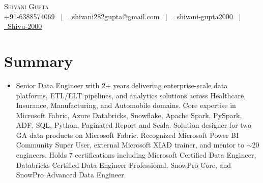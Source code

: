 \documentclass[letterpaper,10.5pt]{article}
\newcommand{\resumeItem}[1]{
  \item\small{
    {#1 \vspace{-2pt}}
  }
}
\newcommand{\resumeSubHeadingListStart}{\begin{itemize}[leftmargin=0.0in, label={}]}
\newcommand{\resumeSubHeadingListEnd}{\end{itemize}}
\begin{document}
\begin{center}
    {\Huge \scshape Shivani Gupta} \\ \vspace{3pt}
    \footnotesize
    \faPhone* +91-6388574069
    \, $\vert$ \,
    \href{mailto:shivani282gupta@gmail.com}{\raisebox{-0.2\height}\faEnvelope\ \underline{shivani282gupta@gmail.com}}
    \, $\vert$ \,
    \href{https://www.linkedin.com/in/shivani-gupta2000/}{\raisebox{-0.2\height}\faLinkedin\ \underline{shivani-gupta2000}}
    \, $\vert$ \,
    \href{https://github.com/Shivu-2000}{\raisebox{-0.2\height}\faGithub\ \underline{Shivu-2000}}
    \vspace{-8pt}
\end{center}


\section{Summary}
\resumeSubHeadingListStart
  \resumeItem{Senior Data Engineer with 2+ years delivering enterprise-scale data platforms, ETL/ELT pipelines, and analytics solutions across Healthcare, Insurance, Manufacturing, and Automobile domains. Core expertise in Microsoft Fabric, Azure Databricks, Snowflake, Apache Spark, PySpark, ADF, SQL, Python, Paginated Report and Scala. Solution designer for two GA data products on Microsoft Fabric. Recognized Microsoft Power BI Community Super User, external Microsoft XIAD trainer, and mentor to $\sim$20 engineers. Holds 7 certifications including Microsoft Certified Data Engineer,  Databricks Certified Data Engineer Professional, SnowPro Core, and SnowPro Advanced Data Engineer.}
\resumeSubHeadingListEnd
\vspace{-13pt}

\end{document}
